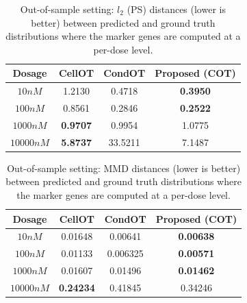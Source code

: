 \begin{table}
  \caption{Out-of-sample setting: $l_2$ (PS) distances (lower is better) between predicted and ground truth distributions where the marker genes are computed at a per-dose level.}
  \label{oos-l2-dose}
  \centering
  {
  \begin{tabular}{cccc}
    \toprule
        Dosage   & CellOT & CondOT & Proposed (COT) \\  
        \midrule
        $10nM$ & 1.2130 & 0.4718 & \textbf{0.3950} \\
        $100nM$ & 0.8561 & 0.2846 & \textbf{0.2522}\\
        $1000nM$ & \textbf{0.9707} & 0.9954 & 1.0775 \\
        $10000nM$ & \textbf{5.8737} & 33.5211 & 7.1487  \\
        \bottomrule 
  \end{tabular}}
\end{table}

\begin{table}
  \caption{Out-of-sample setting: MMD distances (lower is better) between predicted and ground truth distributions where the marker genes are computed at a per-dose level.}
  \label{oos-mmd-dose}
  \centering
  {
  \begin{tabular}{cccc}
    \toprule
        Dosage   & CellOT & CondOT & Proposed (COT) \\  
        \midrule
        $10nM$ & 0.01648 & 0.00641 & \textbf{0.00638} \\
        $100nM$ & 0.01133 & 0.006325  & \textbf{0.00571}\\
        $1000nM$ & 0.01607 & 0.01496 & \textbf{0.01462} \\
        $10000nM$ & \textbf{0.24234} & 0.41845 & 0.34246  \\
        \bottomrule 
  \end{tabular}}
\end{table}


